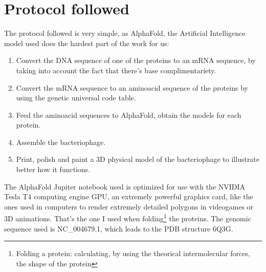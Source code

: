 \section{Protocol followed}
The protocol followed is very simple, as AlphaFold, the Artificial Intelligence model used does the hardest part of the work for us:
\begin{enumerate}[label=\arabic*)]
\item Convert the DNA sequence of one of the proteins to an mRNA sequence, by taking into account the fact that there's base complimentariety.
\item Convert the mRNA sequence to an aminoacid sequence of the proteins by using the genetic universal code table.
\item Feed the aminoacid sequences to AlphaFold, obtain the models for each protein.
\item Assemble the bacteriophage. 
\item Print, polish and paint a 3D physical model of the bacteriophage to illustrate better how it functions.
\end{enumerate}
The AlphaFold Jupiter notebook\cite{GoogleColaboratoryAlpha-} used is optimized for use with the NVIDIA Tesla T4 computing engine GPU, an extremely powerful graphics card, like the ones used in computers to render extremely detailed polygons in videogames or 3D animations. That's the one I used when folding\footnote{Folding a protein: calculating, by using the theorical intermolecular forces, the shape of the protein} the proteins. The genomic sequence used is NC\_004679.1, which leads to the PDB structure 6Q3G.
